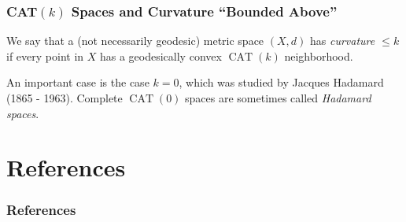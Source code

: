 \documentclass{beamer}
\DeclareMathOperator{\CAT}{CAT}
\theoremstyle{definition}
\begin{document}
\begin{frame}
    \frametitle{CAT$(k)$ Spaces and Curvature ``Bounded Above''}

    \begin{definition}
        We say that a (not necessarily geodesic) metric space $(X,d)$ has \emph{curvature $\leq k$}
        if every point in $X$ has a geodesically convex $\CAT(k)$ neighborhood.
    \end{definition}

    An important case is the case $k = 0$, which was studied by Jacques Hadamard (1865 - 1963).
    Complete $\CAT(0)$ spaces are sometimes called \emph{Hadamard spaces}.

\end{frame}

\section{References}

\begin{frame}
    \frametitle{References}

    \footnotesize
    \printbibliography

\end{frame}
\end{document}
